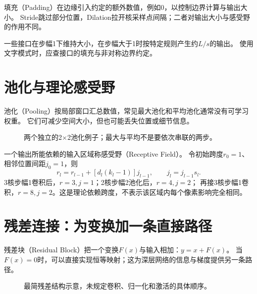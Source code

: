 填充（Padding）在边缘引入约定的额外数值，例如0，以控制边界计算与输出大小。
Stride跳过部分位置，Dilation拉开核采样点间隔；二者对输出大小与感受野的作用不同。

\begin{pitfall}
一些接口在步幅1下维持大小，在步幅大于1时按特定规则产生约$L/s$的输出。
使用文字模式时，应查接口的填充与非对称边界约定。
\end{pitfall}

\section{池化与理论感受野}
\label{sec:cnn-pooling}
池化（Pooling）按局部窗口汇总数值，常见最大池化和平均池化通常没有可学习权重。
它们可减少空间大小，但也可能丢失位置或细节信息。

\begin{figure}[htbp]
\centering
\caption{两个独立的2$\times$2池化例子；最大与平均不是要依次串联的两步。}
\par\smallskip
{}
\end{figure}

一个输出所能依赖的输入区域称感受野（Receptive Field）。
令初始跨度$r_0=1$、相邻位置间距$j_0=1$，则
\[
 r_l=r_{l-1}+[d_l(k_l-1)]j_{l-1},\qquad j_l=j_{l-1}s_l.
\]
3核步幅1卷积后，$r=3,j=1$；2核步幅2池化后，$r=4,j=2$；
再接3核步幅1卷积，$r=8,j=2$。这是理论依赖跨度，不表示该区域内每个像素影响完全相同。


\section{残差连接：为变换加一条直接路径}
\label{sec:cnn-residual}
残差块（Residual Block）把一个变换$F(x)$与输入相加：$y=x+F(x)$。
当$F(x)=0$时，可以直接实现恒等映射；这为深层网络的信息与梯度提供另一条路径。

\begin{figure}[htbp]
\centering
\caption{最简残差结构示意，未规定卷积、归一化和激活的具体顺序。}
\par\smallskip
{}
\end{figure}

